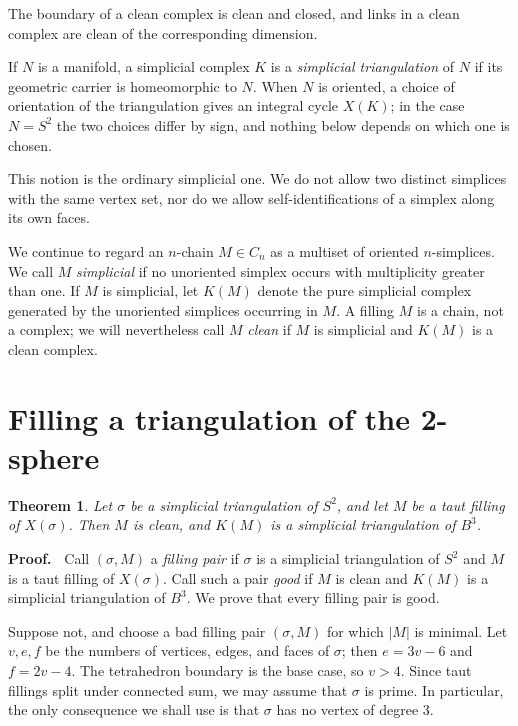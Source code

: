 \documentclass[12pt]{article}
\newtheorem{theorem}{Theorem}
\newcommand{\proofstart}{{\noindent \bf Proof.\ }}
\begin{document}
The boundary of a clean complex is clean and closed, and links in a clean
complex are clean of the corresponding dimension.

If $N$ is a manifold, a simplicial complex $K$ is a \emph{simplicial
triangulation} of $N$ if its geometric carrier is homeomorphic to $N$.  When
$N$ is oriented, a choice of orientation of the triangulation gives an
integral cycle $X(K)$; in the case $N=S^2$ the two choices differ by sign, and
nothing below depends on which one is chosen.

This notion is the ordinary simplicial one.  We do not allow two distinct
simplices with the same vertex set, nor do we allow self-identifications of a
simplex along its own faces.

We continue to regard an $n$-chain $M\in C_n$ as a multiset of oriented
$n$-simplices.  We call $M$ \emph{simplicial} if no unoriented simplex occurs
with multiplicity greater than one.  If $M$ is simplicial, let $K(M)$ denote
the pure simplicial complex generated by the unoriented simplices occurring
in $M$.  A filling $M$ is a chain, not a complex; we will nevertheless call
$M$ \emph{clean} if $M$ is simplicial and $K(M)$ is a clean complex.

\section{Filling a triangulation of the 2-sphere}

\begin{theorem} \label{th2}
Let $\sigma$ be a simplicial triangulation of $S^2$, and let $M$ be a taut
filling of $X(\sigma)$.  Then $M$ is clean, and $K(M)$ is a simplicial
triangulation of $B^3$.
\end{theorem}

\proofstart
Call $(\sigma,M)$ a \emph{filling pair} if $\sigma$ is a simplicial
triangulation of $S^2$ and $M$ is a taut filling of $X(\sigma)$.
Call such a pair \emph{good} if $M$ is clean and $K(M)$ is a simplicial
triangulation of $B^3$.  We prove that every filling pair is good.

Suppose not, and choose a bad filling pair $(\sigma,M)$ for which $|M|$ is
minimal.  Let $v,e,f$ be the numbers of vertices, edges, and faces of
$\sigma$; then $e=3v-6$ and $f=2v-4$.  The tetrahedron boundary is the base
case, so $v>4$.  Since taut fillings split under connected sum, we may assume
that $\sigma$ is prime.  In particular, the only consequence we shall use is
that $\sigma$ has no vertex of degree $3$.
\end{document}
